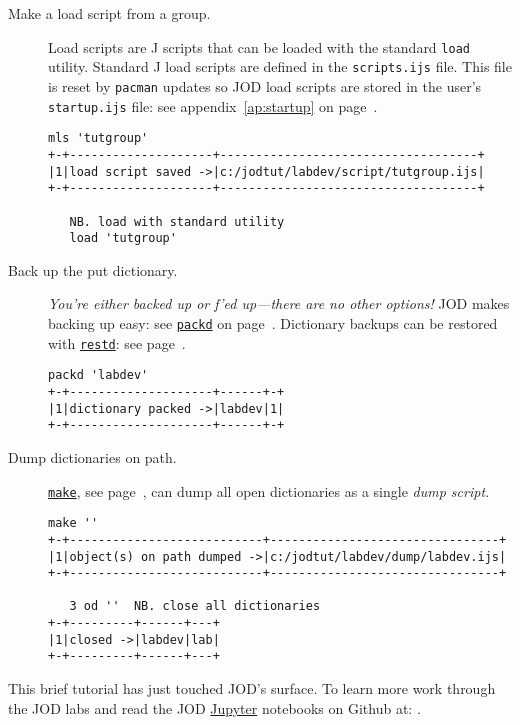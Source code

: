 \begin{description}
\item[Make a load script from a group.] Load scripts are J scripts that can be loaded
with the standard \texttt{load} utility.  Standard J load scripts are defined in the \verb|scripts.ijs| file.  This file is reset by \texttt{pacman} updates
so JOD load scripts are stored in the user's \verb|startup.ijs| file: 
see appendix~\ref{ap:startup} on page~\pageref{ap:startup}.
\begin{lstlisting}[frame=single,framerule=0pt]
   mls 'tutgroup'
+-+--------------------+------------------------------------+
|1|load script saved ->|c:/jodtut/labdev/script/tutgroup.ijs|
+-+--------------------+------------------------------------+

   NB. load with standard utility
   load 'tutgroup'  
\end{lstlisting}

\item[Back up the put dictionary.] \emph{You're either backed up or f'ed up---there are
no other options!} JOD makes backing up 
easy: see \hyperlink{il:packd}{\texttt{packd}} on page~\pageref{ss:packd}. Dictionary
backups can be restored with \hyperlink{il:restd}{\texttt{restd}}: see page~\pageref{ss:restd}.
\begin{lstlisting}[frame=single,framerule=0pt] 
   packd 'labdev'
+-+--------------------+------+-+
|1|dictionary packed ->|labdev|1|
+-+--------------------+------+-+
\end{lstlisting}

\item[Dump dictionaries on path.] \hyperlink{il:make}{\texttt{make}}, see page~\pageref{ss:make},
can dump all open dictionaries as a single \emph{dump script.}
\begin{lstlisting}[frame=single,framerule=0pt]
   make ''
+-+---------------------------+--------------------------------+
|1|object(s) on path dumped ->|c:/jodtut/labdev/dump/labdev.ijs|
+-+---------------------------+--------------------------------+

   3 od '' 	NB. close all dictionaries
+-+---------+------+---+
|1|closed ->|labdev|lab|
+-+---------+------+---+
\end{lstlisting}

\end{description}

This brief tutorial has just touched JOD's surface.  To learn more work through the JOD labs
and read the JOD \href{https://jupyter.org/}{Jupyter} \cite{jupytersite} notebooks on Github at: .